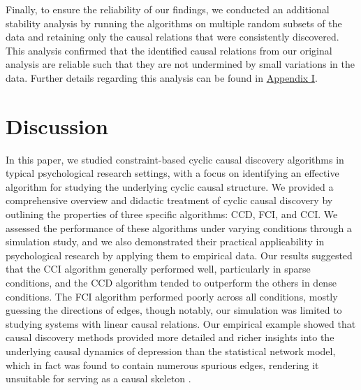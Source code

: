 \documentclass[twoside, 11pt]{article}
\begin{document}
Finally, to ensure the reliability of our findings, we conducted an additional stability analysis by running the algorithms on multiple random subsets of the data and retaining only the causal relations that were consistently discovered. This analysis confirmed that the identified causal relations from our original analysis are reliable such that they are not undermined by small variations in the data. Further details regarding this analysis can be found in \hyperref[stability]{Appendix I}.


\newpage
\section{Discussion}
In this paper, we studied constraint-based cyclic causal discovery algorithms in typical psychological research settings, with a focus on identifying an effective algorithm for studying the underlying cyclic causal structure. We provided a comprehensive overview and didactic treatment of cyclic causal discovery by outlining the properties of three specific algorithms: CCD, FCI, and CCI. 
We assessed the performance of these algorithms under varying conditions through a simulation study, and we also demonstrated their practical applicability in psychological research by applying them to empirical data. 
Our results suggested that the CCI algorithm generally performed well, particularly in sparse conditions, and the CCD algorithm tended to outperform the others in dense conditions. The FCI algorithm performed poorly across all conditions, mostly guessing the directions of edges, though notably, our simulation was limited to studying systems with linear causal relations. Our empirical example showed that causal discovery methods provided more detailed and richer insights into the underlying causal dynamics of depression than the statistical network model, which in fact was found to contain numerous spurious edges, rendering it unsuitable for serving as a causal skeleton \citep{Ryan2022}. 
\end{document}
